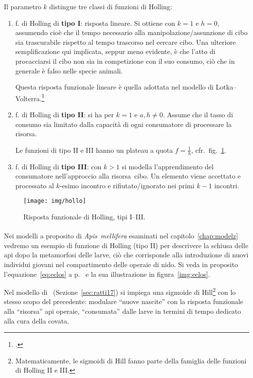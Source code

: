 Il parametro $k$ distingue tre classi di funzioni di Holling:
\begin{enumerate}
    \item f. di Holling di \textbf{tipo I}: risposta lineare. Si ottiene con $k=1$ e $h=0$, assumendo cioè che il tempo
        necessario alla manipolazione/assunzione di cibo sia trascurabile rispetto al tempo trascorso nel cercare cibo.
        Una ulteriore semplificazione qui implicata, seppur meno evidente, è che l'atto di procacciarsi il cibo non sia
        in competizione con il suo consumo, ciò che in generale è falso nelle specie animali.

        Questa risposta funzionale lineare è quella adottata nel modello di Lotka--Volterra.\footcite{vito}
    \item f. di Holling di \textbf{tipo II}: si ha per $k=1$ e $a,h \neq 0$. Assume che il tasso di consumo sia limitato
        dalla capacità di ogni consumatore di processare la risorsa.

        Le funzioni di tipo II e III hanno un plateau a quota $f=\frac{1}{h}$, cfr.~fig.~\ref{img:hollo}.

    \item f. di Holling di \textbf{tipo III}: con $k>1$ si modella l'apprendimento del consumatore nell'approccio alla
        risorsa~cibo. Un elemento viene accettato e processato al $k$-esimo incontro e rifiutato/ignorato nei
        primi $k-1$ incontri.
\end{enumerate}

\begin{figure}[hbt]
    \centering
    \texttt{[image: img/hollo]}

    \caption{Risposta funzionale di Holling, tipi I--III.}
    \label{img:hollo}
\end{figure}

\paragraph{}
Nei modelli a proposito di \emph{Apis~mellifera} esaminati nel capitolo~\ref{chap:modelz} vedremo un esempio di
funzione di Holling (tipo II) per descrivere la schiusa delle api dopo la metamorfosi delle larve, ciò che corrisponde alla
introduzione di nuovi individui giovani nel compartimento delle operaie di nido.
Si veda in proposito l'equazione~\eqref{eq:eclos} a p.~\pageref{eq:eclos} e la sua illustrazione in figura~\ref{img:eclos}.

Nel modello di~\citeauthor{ratti2017} (Sezione~\ref{sec:ratti17}) si impiega una sigmoide di Hill\footnote{Matematicamente, le sigmoidi di Hill fanno parte della famiglia delle funzioni di Holling II e III.}
con lo stesso scopo del precedente: modulare ``nuove nascite'' con la risposta funzionale alla ``risorsa'' api operaie,
``consumata'' dalle larve in termini di tempo dedicato alla cura della covata.

